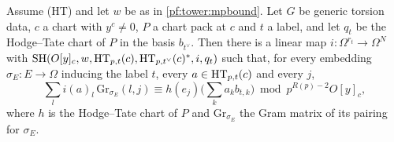 \begin{lemma}\label{pf:tower:mpdegree}
Assume \textup{(HT)} and let $w$ be as in \cref{pf:tower:mpbound}. Let $G$ be generic torsion data, $c$ a chart with
$y^c\ne0$, $P$ a chart pack at $c$ and $t$ a label, and let $q_t$ be the Hodge--Tate chart of $P$ in the basis $b_{t^\vee}$. Then
there is a linear map $i\colon\Omega^{r_t}\to\Omega^N$ with
$\mathrm{SH}(O[y]_c,w,\mathrm{HT}_{p,t}(c),\mathrm{HT}_{p,t^\vee}(c)^*,i,q_t)$ such that, for every embedding $\sigma_E\colon E\to\Omega$
inducing the label $t$, every $a\in\mathrm{HT}_{p,t}(c)$ and every $j$,
\[
\textstyle\sum_li(a)_l\,\mathrm{Gr}_{\sigma_E}(l,j)\equiv h(e_j)\bigl(\sum_ka_kb_{t,k}\bigr)\bmod p^{R(p)-2}O[y]_c,
\]
where $h$ is the Hodge--Tate chart of $P$ and $\mathrm{Gr}_{\sigma_E}$ the Gram matrix of its pairing for $\sigma_E$.
\end{lemma}

